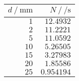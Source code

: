 \begin{tabular}{rr}
	\toprule
	$d ~/~ \si{\milli\meter}$ & $N ~/~ \si{\per\second}$\\
	\midrule
	$\num{1}$ & $\num{12.4932}$ \\
	$\num{2}$ & $\num{11.2221}$ \\
	$\num{5}$ & $\num{11.0592}$ \\
	$\num{10}$ & $\num{5.26505}$ \\
	$\num{15}$ & $\num{3.27983}$ \\
	$\num{20}$ & $\num{1.85586}$ \\
	$\num{25}$ & $\num{0.954194}$ \\
	\bottomrule
\end{tabular}

